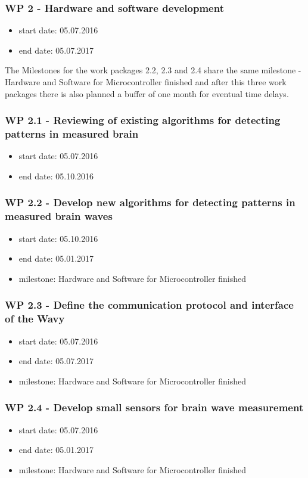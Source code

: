 \subsubsection{WP 2 - Hardware and software development}
\begin{itemize}
\item start date: 05.07.2016
\item end date:  05.07.2017
\end{itemize}

The Milestones for the work packages 2.2, 2.3 and 2.4 share the same milestone - Hardware and Software for Microcontroller finished and after this three work packages there is also planned a buffer of one month for eventual time delays.

\subsubsection{WP 2.1 - Reviewing of existing algorithms for detecting patterns in measured brain}
\begin{itemize}
\item start date: 05.07.2016
\item end date:  05.10.2016
\end{itemize}
\subsubsection{WP 2.2 - Develop new algorithms for detecting patterns in measured brain waves}
\begin{itemize}
\item start date: 05.10.2016
\item end date:  05.01.2017
\item milestone: Hardware and Software for Microcontroller finished 
\end{itemize}
\subsubsection{WP 2.3 - Define the communication protocol and interface of the Wavy}
\begin{itemize}
\item start date: 05.07.2016
\item end date:  05.07.2017
\item milestone: Hardware and Software for Microcontroller finished 
\end{itemize}
\subsubsection{WP 2.4 - Develop small sensors for brain wave measurement}
\begin{itemize}
\item start date: 05.07.2016
\item end date: 05.01.2017
\item milestone: Hardware and Software for Microcontroller finished 
\end{itemize}
